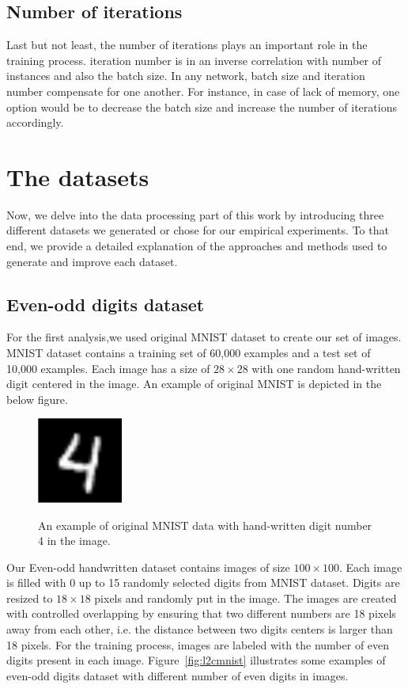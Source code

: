 \subsection{Number of iterations}

Last but not least, the number of iterations plays an important role in the training process. iteration number is in an inverse correlation with number of instances and also the batch size. In any network, batch size and iteration number compensate for one another. For instance, in case of lack of memory, one option would be to decrease the batch size and increase the number of iterations accordingly.

\section{The datasets}

Now, we delve into the data processing part of this work by introducing three different datasets we generated or chose for our empirical experiments. To that end, we provide a detailed explanation of the approaches and methods used to generate and improve each dataset.

\subsection{Even-odd digits dataset}
\label{subsubsec:digit}
For the first analysis,we used original MNIST dataset \cite{lecun1998mnist} to create our set of images. MNIST dataset contains a training set of 60,000 examples and a test set of 10,000 examples. Each image has a size of $28\times28$ with one random hand-written digit centered in the image. 
An example of original MNIST is depicted in the below figure.

\begin{figure}[H]
	\centering
	{\includegraphics[width=0.25\textwidth]{images/mnist}}
		\caption{An example of original MNIST data with hand-written digit number 4 in the image. }
	\label{fig:mnist}
\end{figure}

Our Even-odd handwritten dataset contains images of size $100\times100$. Each image is filled with 0 up to 15 randomly selected digits from MNIST dataset. Digits are resized to $18\times18$ pixels and randomly put in the image. The images are created with controlled overlapping by ensuring that two different numbers are 18 pixels away from each other, i.e. the distance between two digits centers is larger than 18 pixels. For the training process, images are labeled with the number of even digits present in each image. Figure~\ref{fig:l2cmnist} illustrates some examples of even-odd digits dataset with different number of even digits in images. 

